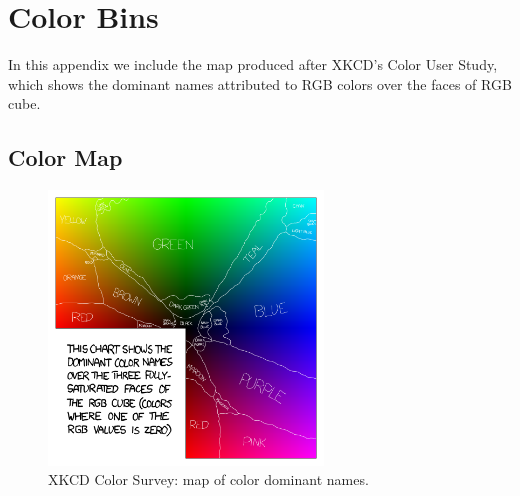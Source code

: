 
\chapter{Color Bins}
\label{appendix:colorBins}

In this appendix we include the map produced after XKCD's Color User Study, which shows the dominant names
attributed to RGB colors over the faces of RGB cube.

\section{Color Map}
%
\begin{figure}[htbp]
	\centering
  \includegraphics[width=0.65\textwidth]{images/results/satfaces_map.png}
  \caption[XKCD Color Survey: Color Dominant Names]{XKCD Color Survey: map of color dominant names.}
  \label{fig:colornames_xkcd}
\end{figure} \par
